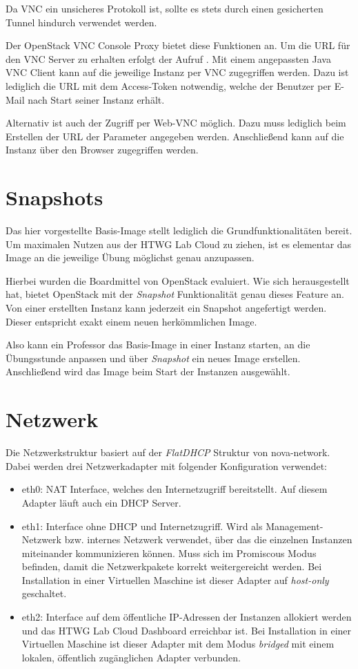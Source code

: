 Da VNC ein unsicheres Protokoll ist, sollte es stets durch einen gesicherten Tunnel hindurch verwendet werden.

Der OpenStack VNC Console Proxy bietet diese Funktionen an.
Um die URL für den VNC Server zu erhalten erfolgt der Aufruf .
Mit einem angepassten Java VNC Client \cite{vncJava} kann auf die jeweilige Instanz per VNC zugegriffen werden. 
Dazu ist lediglich die URL mit dem Access-Token notwendig, welche der Benutzer per E-Mail nach Start seiner Instanz erhält.

Alternativ ist auch der Zugriff per Web-VNC möglich. 
Dazu muss lediglich beim Erstellen der URL der Parameter  angegeben werden. 
Anschließend kann auf die Instanz über den Browser zugegriffen werden.

\section{Snapshots}

Das hier vorgestellte Basis-Image stellt lediglich die Grundfunktionalitäten bereit. 
Um maximalen Nutzen aus der HTWG Lab Cloud zu ziehen, ist es elementar das Image an die jeweilige Übung möglichst genau anzupassen.

Hierbei wurden die Boardmittel von OpenStack evaluiert.
Wie sich herausgestellt hat, bietet OpenStack mit der \emph{Snapshot} Funktionalität genau dieses Feature an.
Von einer erstellten Instanz kann jederzeit ein Snapshot angefertigt werden.
Dieser entspricht exakt einem neuen herkömmlichen Image.

Also kann ein Professor das Basis-Image in einer Instanz starten, an die Übungsstunde anpassen und über \emph{Snapshot} ein neues Image erstellen.
Anschließend wird das Image beim Start der Instanzen ausgewählt.

\section{Netzwerk}

Die Netzwerkstruktur basiert auf der \emph{FlatDHCP} Struktur von nova-network. 
Dabei werden drei Netzwerkadapter mit folgender Konfiguration verwendet:

\begin{itemize}
\item eth0: NAT Interface, welches den Internetzugriff bereitstellt. Auf diesem Adapter läuft auch ein DHCP Server.
\item eth1: Interface ohne DHCP und Internetzugriff. Wird als Management-Netzwerk bzw. internes Netzwerk verwendet, über das die einzelnen Instanzen miteinander kommunizieren können. Muss sich im Promiscous Modus befinden, damit die Netzwerkpakete korrekt weitergereicht werden. Bei Installation in einer Virtuellen Maschine ist dieser Adapter auf \emph{host-only} geschaltet.
\item eth2: Interface auf dem öffentliche IP-Adressen der Instanzen allokiert werden und das HTWG Lab Cloud Dashboard erreichbar ist. Bei Installation in einer Virtuellen Maschine ist dieser Adapter mit dem Modus \emph{bridged}  mit einem lokalen, öffentlich zugänglichen Adapter verbunden.
\end{itemize}

